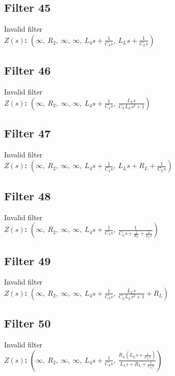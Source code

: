 \documentclass{article}
\begin{document}
\subsection*{Filter 45}
Invalid filter \\ 
\textbf{$Z(s)$:} $\left( \infty, \  R_{2}, \  \infty, \  \infty, \  L_{4} s + \frac{1}{C_{4} s}, \  L_{L} s + \frac{1}{C_{L} s}\right)$ \\ 
\subsection*{Filter 46}
Invalid filter \\ 
\textbf{$Z(s)$:} $\left( \infty, \  R_{2}, \  \infty, \  \infty, \  L_{4} s + \frac{1}{C_{4} s}, \  \frac{L_{L} s}{C_{L} L_{L} s^{2} + 1}\right)$ \\ 
\subsection*{Filter 47}
Invalid filter \\ 
\textbf{$Z(s)$:} $\left( \infty, \  R_{2}, \  \infty, \  \infty, \  L_{4} s + \frac{1}{C_{4} s}, \  L_{L} s + R_{L} + \frac{1}{C_{L} s}\right)$ \\ 
\subsection*{Filter 48}
Invalid filter \\ 
\textbf{$Z(s)$:} $\left( \infty, \  R_{2}, \  \infty, \  \infty, \  L_{4} s + \frac{1}{C_{4} s}, \  \frac{1}{C_{L} s + \frac{1}{R_{L}} + \frac{1}{L_{L} s}}\right)$ \\ 
\subsection*{Filter 49}
Invalid filter \\ 
\textbf{$Z(s)$:} $\left( \infty, \  R_{2}, \  \infty, \  \infty, \  L_{4} s + \frac{1}{C_{4} s}, \  \frac{L_{L} s}{C_{L} L_{L} s^{2} + 1} + R_{L}\right)$ \\ 
\subsection*{Filter 50}
Invalid filter \\ 
\textbf{$Z(s)$:} $\left( \infty, \  R_{2}, \  \infty, \  \infty, \  L_{4} s + \frac{1}{C_{4} s}, \  \frac{R_{L} \left(L_{L} s + \frac{1}{C_{L} s}\right)}{L_{L} s + R_{L} + \frac{1}{C_{L} s}}\right)$ \\ 
\end{document}
